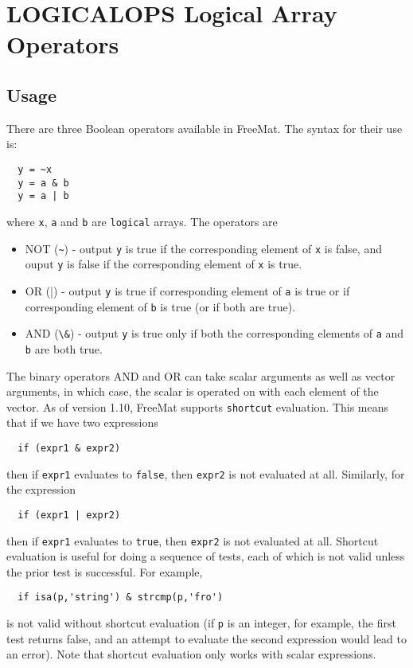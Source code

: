 \section{LOGICALOPS Logical Array Operators}

\subsection{Usage}

There are three Boolean operators available in FreeMat.  The syntax for their use is:
\begin{verbatim}
  y = ~x
  y = a & b
  y = a | b
\end{verbatim}
where \verb|x|, \verb|a| and \verb|b| are \verb|logical| arrays.  The operators are
\begin{itemize}
\item  NOT (\verb|~|) - output \verb|y| is true if the corresponding element of \verb|x| is false, and ouput \verb|y| is false if the corresponding element of \verb|x| is true.

\item  OR (\verb|||) - output \verb|y| is true if corresponding element of \verb|a| is true or if corresponding element of \verb|b| is true (or if both are true).

\item  AND (\verb|\&|) - output \verb|y| is true only if both the corresponding elements of \verb|a| and \verb|b| are both true.

\end{itemize}
The binary operators AND and OR can take scalar arguments as well as vector arguments, in which case, the scalar is operated on with each element of the vector.
As of version 1.10, FreeMat supports \verb|shortcut| evaluation.  This means that
if we have two expressions
\begin{verbatim}
  if (expr1 & expr2)
\end{verbatim}
then if \verb|expr1| evaluates to \verb|false|, then \verb|expr2| is not evaluated at all.
Similarly, for the expression
\begin{verbatim}
  if (expr1 | expr2)
\end{verbatim}
then if \verb|expr1| evaluates to \verb|true|, then \verb|expr2| is not evaluated at all.
Shortcut evaluation is useful for doing a sequence of tests, each of which is
not valid unless the prior test is successful.  For example,
\begin{verbatim}
  if isa(p,'string') & strcmp(p,'fro')
\end{verbatim}
is not valid without shortcut evaluation (if \verb|p| is an integer, for example,
the first test returns false, and an attempt to evaluate the second expression
would lead to an error).  Note that shortcut evaluation only works with scalar
expressions.
